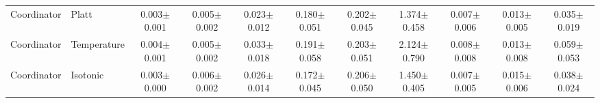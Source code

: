 \begin{table}[t]
\begin{tabular}{@{}ll@{\ }ccccccccc@{}}
Coordinator & Platt & 0.003$\pm$0.001 & 0.005$\pm$0.002 & 0.023$\pm$0.012 & 0.180$\pm$0.051 & 0.202$\pm$0.045 & 1.374$\pm$0.458 & 0.007$\pm$0.006 & 0.013$\pm$0.005 & 0.035$\pm$0.019 \\
Coordinator & Temperature & 0.004$\pm$0.001 & 0.005$\pm$0.002 & 0.033$\pm$0.018 & 0.191$\pm$0.058 & 0.203$\pm$0.051 & 2.124$\pm$0.790 & 0.008$\pm$0.008 & 0.013$\pm$0.008 & 0.059$\pm$0.053 \\
Coordinator & Isotonic & 0.003$\pm$0.000 & 0.006$\pm$0.002 & 0.026$\pm$0.014 & 0.172$\pm$0.045 & 0.206$\pm$0.050 & 1.450$\pm$0.405 & 0.007$\pm$0.005 & 0.015$\pm$0.006 & 0.038$\pm$0.024 \\
\bottomrule
\end{tabular}
\end{table}

